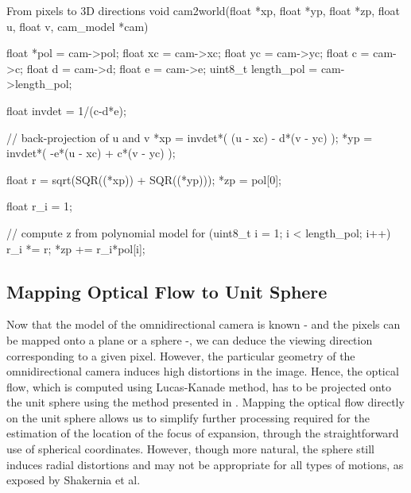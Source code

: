 \begin{code}[colback=white, label=code:cameraModel]{From pixels to 3D directions}
void cam2world(float *xp, float *yp, float *zp, float u, 
		float v, cam_model *cam)
{
	 float *pol    = cam->pol;
	 float xc      = cam->xc;
	 float yc      = cam->yc; 
	 float c       = cam->c;
	 float d       = cam->d;
	 float e       = cam->e;
	 uint8_t length_pol = cam->length_pol;

	 float invdet  = 1/(c-d*e);

	 // back-projection of u and v
	 *xp = invdet*(    (u - xc) - d*(v - yc) );
	 *yp = invdet*( -e*(u - xc) + c*(v - yc) );
	  
	 float r = sqrt(SQR((*xp)) + SQR((*yp)));
	 *zp  	 = pol[0];
	 
	 float r_i = 1;
	 
	 // compute z from polynomial model
	 for (uint8_t i = 1; i < length_pol; i++)
	 {
	   r_i *= r;
	   *zp += r_i*pol[i];
	 }
}
\end{code}

\subsection{Mapping Optical Flow to Unit Sphere}
Now that the model of the omnidirectional camera is known - and the pixels can be mapped onto a plane or a sphere -, we can deduce the viewing direction corresponding to a given pixel. However, the particular geometry of the omnidirectional camera induces high distortions in the image. Hence, the optical flow, which is computed using Lucas-Kanade method, has to be projected onto the unit sphere using the method presented in \cite{backproj}. Mapping the optical flow directly on the unit sphere allows us to simplify further processing required for the estimation of the location of the focus of expansion, through the straightforward use of spherical coordinates. However, though more natural, the sphere still induces radial distortions and may not be appropriate for all types of motions, as exposed by Shakernia et al.

